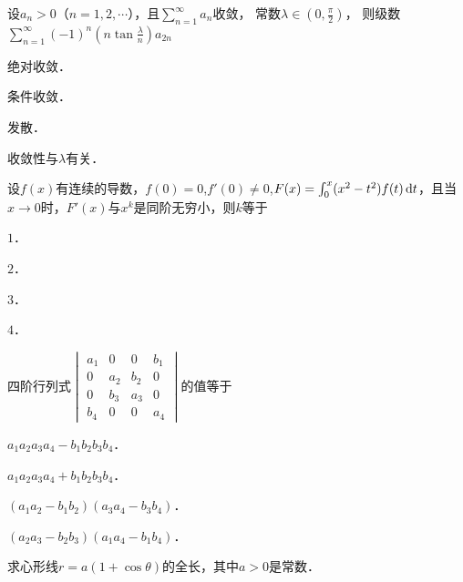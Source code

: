 \documentclass[plain,noanswer,medmath]{../../template/jnuexam}
\begin{document}
\begin{problem}
设$a_n > 0$（$n = 1,2, \cdots$），且$\sum_{n = 1}^{\infty}a_n$收敛，
常数$\lambda \in \left(0,\frac{\pi}{2} \right)$，
则级数$\sum_{n = 1}^{\infty}(- 1)^n\left(n\tan \frac{\lambda}{n} \right) a_{2n}$\pickout{}
\begin{abcd}
\item 绝对收敛．   
\item 条件收敛．   
\item 发散．   
\item 收敛性与$\lambda$有关．
\end{abcd}
\end{problem}


\begin{problem}
设$f(x)$有连续的导数，$f(0) = 0$,$f'(0) \ne 0$,$F(x) = \int_0^x (x^2 - t^2)f(t)\mathop{}\!\mathrm{d} t$，且当$x \to 0$时，$F'(x)$与$x^k$是同阶无穷小，则$k$等于\pickout{}
\begin{abcd}
\item $1$．          
\item $2$．          
\item $3$．          
\item $4$．
\end{abcd}
\end{problem}


\begin{problem}
四阶行列式$\begin{vmatrix}
  a_1 &   0 &   0 & b_1 \\
    0 & a_2 & b_2 & 0 \\
    0 & b_3 & a_3 & 0 \\
  b_4 &   0 &   0 & a_4
\end{vmatrix}$的值等于\pickout{}
\begin{abcd}
\item $a_1a_2a_3a_4 - b_1b_2b_3b_4$．					
\item $a_1a_2a_3a_4 + b_1b_2b_3b_4$．
\item $(a_1a_2 - b_1b_2)(a_3a_4 - b_3b_4)$．			
\item $(a_2a_3 - b_2b_3)(a_1a_4 - b_1b_4)$．
\end{abcd}
\end{problem}




\begin{problem}
求心形线$r = a(1 + \cos \theta)$的全长，其中$a > 0$是常数．
\end{problem}
\end{document}
